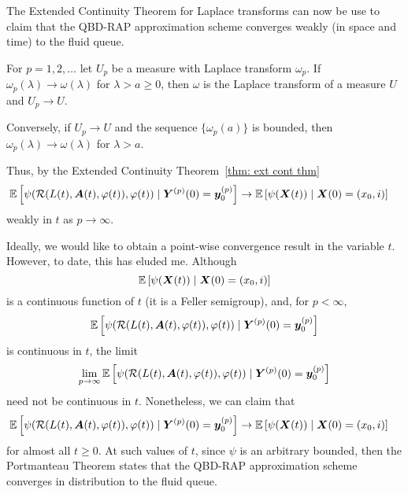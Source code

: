 The Extended Continuity Theorem for Laplace transforms \cite[Chapter XIII, Theorem 2a]{feller1957} can now be use to claim that the QBD-RAP approximation scheme converges weakly (in space and time) to the fluid queue.
\begin{thm}\label{thm: ext cont thm}
	For \(p=1,2,\dots\) let \(U_p\) be a measure with Laplace transform \(\omega_p\). If \(\omega_p(\lambda)\to\omega(\lambda)\) for \(\lambda > a\geq 0\), then \(\omega\) is the Laplace transform of a measure \(U\) and \(U_p\to U\).
	
	Conversely, if \(U_p\to U\) and the sequence \(\{\omega_p(a)\}\) is bounded, then \(\omega_p(\lambda)\to\omega(\lambda)\) for \(\lambda >a\). 
\end{thm}
Thus, by the Extended Continuity Theorem~\ref{thm: ext cont thm}
\begin{align}
		&\mathbb E\left[\psi( \mathcal R(L(t),\boldsymbol A(t),\varphi(t)),\varphi(t) )   \mid \boldsymbol Y^{(p)}(0)=\boldsymbol y_0^{(p)} \right] \nonumber 
		\to \mathbb E\left[\psi({\boldsymbol X}(t))\mid \boldsymbol X(0)=(x_0, i) \right] \nonumber
\end{align}
weakly in \(t\) as \(p\to \infty\). 

Ideally, we would like to obtain a point-wise convergence result in the variable \(t\). However, to date, this has eluded me. Although 
\[\mathbb E\left[\psi({\boldsymbol X}(t))\mid \boldsymbol X(0)=(x_0,i) \right]\] 
is a continuous function of \(t\) (it is a Feller semigroup), and, for \(p<\infty\), 
\[\mathbb E\left[\psi( \mathcal R(L(t),\boldsymbol A(t),\varphi(t)),\varphi(t) )   \mid \boldsymbol Y^{(p)}(0)=\boldsymbol y_0^{(p)} \right]  \]
 is continuous in \(t\), the limit 
 \[\lim\limits_{p\to\infty}\mathbb E\left[\psi( \mathcal R(L(t),\boldsymbol A(t),\varphi(t)),\varphi(t) ) \mid \boldsymbol Y^{(p)}(0)=\boldsymbol y_0^{(p)}\right]  \] need not be continuous in \(t\). Nonetheless, we can claim that 
\begin{align}
		&\mathbb E\left[\psi( \mathcal R(L(t),\boldsymbol A(t),\varphi(t)),\varphi(t) )    \mid \boldsymbol Y^{(p)}(0)=\boldsymbol y_0^{(p)}\right]  \nonumber
		\to \mathbb E\left[\psi({\boldsymbol X}(t) )\mid \boldsymbol X(0)=(x_0, i) \right] \nonumber
\end{align}
for almost all \(t\geq 0\). At such values of \(t\), since \(\psi\) is an arbitrary bounded, then the Portmanteau Theorem \citep[Theorem 2.1, page 16]{billingsleyconvergence} states that the QBD-RAP approximation scheme converges in distribution to the fluid queue.

